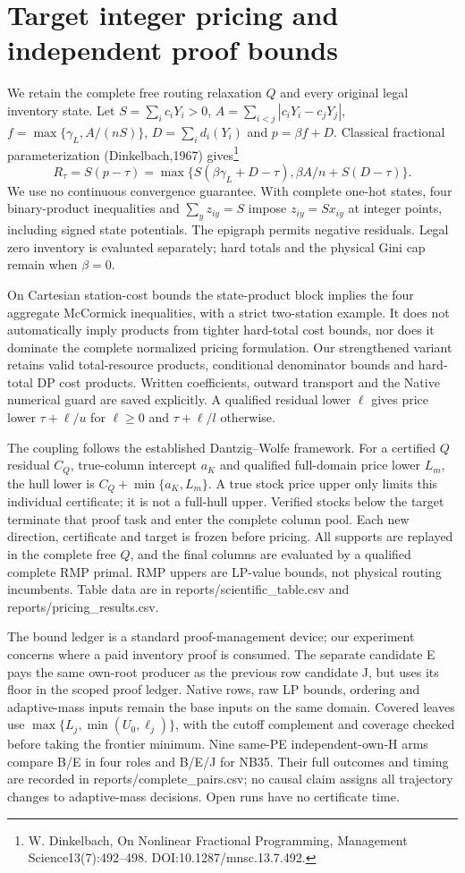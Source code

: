 \section{Target integer pricing and independent proof bounds}
We retain the complete free routing relaxation $Q$ and every original legal
inventory state. Let $S=\sum_i c_iY_i>0$, $A=\sum_{i<j}|c_iY_i-c_jY_j|$,
$f=\max\{\gamma_L,A/(nS)\}$, $D=\sum_i d_i(Y_i)$ and $p=\beta f+D$.
Classical fractional parameterization (Dinkelbach,1967) gives\footnote{W. Dinkelbach, On Nonlinear Fractional Programming, Management Science13(7):492--498. DOI:10.1287/mnsc.13.7.492.}
\[
R_\tau=S(p-\tau)=\max\{S(\beta\gamma_L+D-\tau),\beta A/n+S(D-\tau)\}.
\]
We use no continuous convergence guarantee. With complete one-hot states,
four binary-product inequalities and $\sum_y z_{iy}=S$ impose
$z_{iy}=Sx_{iy}$ at integer points, including signed state potentials.
The epigraph permits negative residuals. Legal zero inventory is evaluated
separately; hard totals and the physical Gini cap remain when $\beta=0$.

On Cartesian station-cost bounds the state-product block implies the four
aggregate McCormick inequalities, with a strict two-station example.
It does not automatically imply products from tighter hard-total cost
bounds, nor does it dominate the complete normalized pricing formulation.
Our strengthened variant retains valid total-resource products, conditional
denominator bounds and hard-total DP cost products. Written coefficients,
outward transport and the Native numerical guard are saved explicitly.
A qualified residual lower $\ell$ gives price lower
$\tau+\ell/u$ for $\ell\ge0$ and $\tau+\ell/l$ otherwise.

The coupling follows the established Dantzig--Wolfe framework. For a certified $Q$ residual $C_Q$, true-column intercept $a_K$ and qualified
full-domain price lower $L_m$, the hull lower is
$C_Q+\min\{a_K,L_m\}$. A true stock price upper only limits this individual
certificate; it is not a full-hull upper. Verified stocks below the target
terminate that proof task and enter the complete column pool. Each new
direction, certificate and target is frozen before pricing. All supports
are replayed in the complete free $Q$, and the final columns are evaluated
by a qualified complete RMP primal. RMP uppers are LP-value bounds, not
physical routing incumbents. Table data are in reports/scientific_table.csv
and reports/pricing_results.csv.

The bound ledger is a standard proof-management device; our experiment concerns where a paid inventory proof is consumed. The separate candidate E pays the same own-root producer as the previous
row candidate J, but uses its floor in the scoped proof ledger. Native rows,
raw LP bounds, ordering and adaptive-mass inputs remain the base inputs on
the same domain. Covered leaves use $\max\{L_j,\min(U_0,\ell_j)\}$, with
the cutoff complement and coverage checked before taking the frontier
minimum. Nine same-PE independent-own-H arms compare B/E in four roles and
B/E/J for NB35. Their full outcomes and timing are recorded in
reports/complete_pairs.csv; no causal claim assigns all trajectory changes
to adaptive-mass decisions. Open runs have no certificate time.

